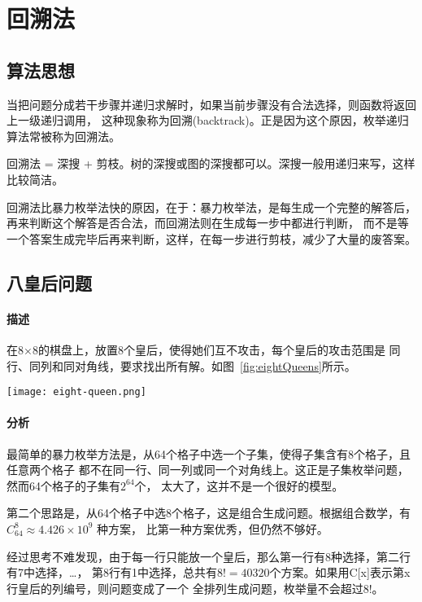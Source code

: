 \chapter{回溯法}

\section{算法思想} %

当把问题分成若干步骤并递归求解时，如果当前步骤没有合法选择，则函数将返回上一级递归调用，
这种现象称为回溯(backtrack)。正是因为这个原因，枚举递归算法常被称为回溯法。

回溯法 = 深搜 + 剪枝。树的深搜或图的深搜都可以。深搜一般用递归来写，这样比较简洁。

回溯法比暴力枚举法快的原因，在于：暴力枚举法，是每生成一个完整的解答后，
再来判断这个解答是否合法，而回溯法则在生成每一步中都进行判断，
而不是等一个答案生成完毕后再来判断，这样，在每一步进行剪枝，减少了大量的废答案。

\section{八皇后问题} %

\subsubsection{描述}
在8×8的棋盘上，放置8个皇后，使得她们互不攻击，每个皇后的攻击范围是
同行、同列和同对角线，要求找出所有解。如图~\ref{fig:eightQueens}所示。

\begin{center}
\texttt{[image: eight-queen.png]} \\
\label{fig:eightQueens}
\end{center}

\subsubsection{分析}
最简单的暴力枚举方法是，从64个格子中选一个子集，使得子集含有8个格子，且任意两个格子
都不在同一行、同一列或同一个对角线上。这正是子集枚举问题，然而64个格子的子集有$2^{64}$个，
太大了，这并不是一个很好的模型。

第二个思路是，从64个格子中选8个格子，这是组合生成问题。根据组合数学，有 $C_{64}^{8} \approx 4.426 \times 10^9$ 种方案，
比第一种方案优秀，但仍然不够好。

经过思考不难发现，由于每一行只能放一个皇后，那么第一行有8种选择，第二行有7中选择，…，
第8行有1中选择，总共有$8!=40320$个方案。如果用C[x]表示第x行皇后的列编号，则问题变成了一个
全排列生成问题，枚举量不会超过8!。

